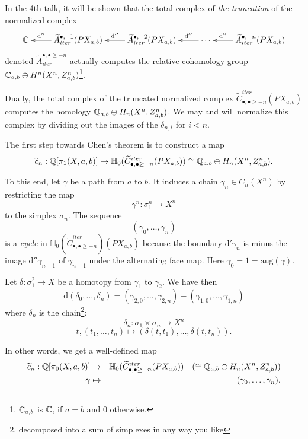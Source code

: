 In the 4th talk, it will be shown that the total complex of {\em the truncation} of the normalized complex 
\[
\xymatrix{
\C & \widetilde{A}_{iter}^{ \bullet, -1}(PX_{a,b})  \ar[l]_-{\mathrm{d}''} & \widetilde{A}_{iter}^{\bullet,-2}(PX_{a,b})  \ar[l]_-{\mathrm{d}''} & \cdots   \ar[l]_-{\mathrm{d}''} & \widetilde{A}_{iter}^{\bullet,-n}(PX_{a,b})  \ar[l]_-{\mathrm{d}''}
}
\]
denoted $\widetilde{A}_{iter}^{\bullet , \bullet \ge -n}$ actually computes the relative cohomology group $\mathbb{C}_{a,b} \oplus H^n(X^n, Z^n_{a,b})$\footnote{$\mathbb{C}_{a,b}$ is $\mathbb{C}$, if $a=b$ and $0$ otherwise.}.

Dually, the total complex of the truncated normalized complex $\widetilde{C}_{\bullet , \bullet \ge -n}^{iter}(PX_{a,b})$ computes the homology $\mathbb{Q}_{a,b} \oplus H_n(X^n, Z^n_{a,b})$.
We may and will normalize this complex by dividing out the images of the $\delta_{n,i}$ for $i<n$. 

The first step towards Chen's theorem is to construct a map
\[  \widetilde{c}_n: \mathbb{Q}[\pi_1(X, a,b)] \rightarrow \mathbb{H}_0(\widetilde{C}_{\bullet ,\bullet \ge -n}^{iter}(PX_{a,b})) \cong \mathbb{Q}_{a,b} \oplus H_n(X^n, Z^n_{a,b}). \]

To this end, let $\gamma$ be a path from $a$ to $b$. It induces a chain $\gamma_n \in C_n(X^n)$ by restricting the map
\[ \gamma^n: \sigma_1^n \rightarrow X^n \]
to the simplex $\sigma_n$.
The sequence
\[ (\gamma_0, \dots, \gamma_n) \]
is a {\em cycle} in $\mathbb{H}_0(\widetilde{C}_{\bullet ,\bullet \ge -n}^{iter})(PX_{a,b})$ because the boundary $\mathrm{d'} \gamma_n$ is minus the image 
$\mathrm{d}'' \gamma_{n-1}$ of $\gamma_{n-1}$ under the alternating face map.
Here $\gamma_0=1=\textrm{aug}(\gamma)$.

Let $\delta: \sigma_1^2 \rightarrow X$ be a homotopy from $\gamma_1$ to $\gamma_2$.
We have then 
\[ \mathrm{d} (\delta_0, \dots, \delta_n) = (\gamma_{2,0}, \dots, \gamma_{2,n}) - (\gamma_{1,0}, \dots, \gamma_{1,n})  \]
where $\delta_n$ is the chain\footnote{decomposed into a sum of simplexes in any way you like}:
\[ \delta_n: \sigma_1 \times \sigma_n \rightarrow X^n \]
\[ t, (t_1, \dots, t_n) \mapsto (\delta(t, t_1), \dots, \delta(t, t_n)).  \]

In other words, we get a well-defined map 
\begin{eqnarray*} 
\widetilde{c}_n: \mathbb{Q}[\pi_0(X, a,b)] &\rightarrow& \mathbb{H}_0(\widetilde{C}^{iter}_{\bullet,\bullet  \ge -n}(PX_{a,b})) \quad (\cong \mathbb{Q}_{a,b} \oplus  H_n(X^n, Z^n_{a,b}))  \\
 \gamma &\mapsto&  (\gamma_0, \dots, \gamma_n). 
\end{eqnarray*}

